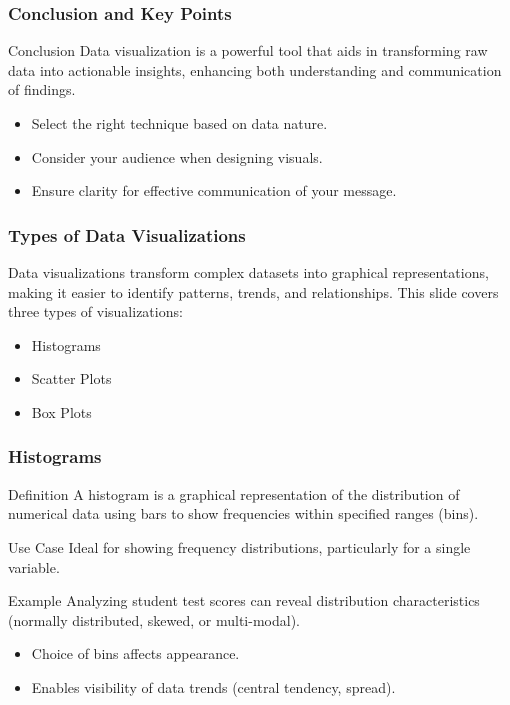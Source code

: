 \documentclass[aspectratio=169]{beamer}
\begin{document}
\begin{frame}[fragile]
    \frametitle{Conclusion and Key Points}
    \begin{block}{Conclusion}
        Data visualization is a powerful tool that aids in transforming raw data into actionable insights, enhancing both understanding and communication of findings.
    \end{block}
    
    \begin{itemize}
        \item Select the right technique based on data nature.
        \item Consider your audience when designing visuals.
        \item Ensure clarity for effective communication of your message.
    \end{itemize}
\end{frame}

\begin{frame}[fragile]
    \frametitle{Types of Data Visualizations}
    
    Data visualizations transform complex datasets into graphical representations, making it easier to identify patterns, trends, and relationships. This slide covers three types of visualizations: 
    \begin{itemize}
        \item Histograms
        \item Scatter Plots
        \item Box Plots
    \end{itemize}
\end{frame}

\begin{frame}[fragile]
    \frametitle{Histograms}
    
    \begin{block}{Definition}
        A histogram is a graphical representation of the distribution of numerical data using bars to show frequencies within specified ranges (bins).
    \end{block}
    
    \begin{block}{Use Case}
        Ideal for showing frequency distributions, particularly for a single variable.
    \end{block}
    
    \begin{block}{Example}
        Analyzing student test scores can reveal distribution characteristics (normally distributed, skewed, or multi-modal).
    \end{block}
    
    \begin{itemize}
        \item Choice of bins affects appearance.
        \item Enables visibility of data trends (central tendency, spread).
    \end{itemize}
\end{frame}
\end{document}
